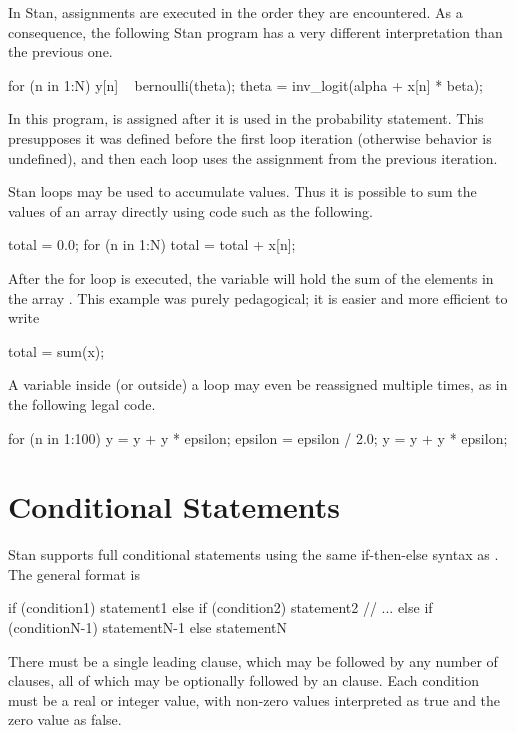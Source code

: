 In Stan, assignments are executed in the order they are encountered.
As a consequence, the following Stan program has a very different
interpretation than the previous one.
%
\begin{stancode}
for (n in 1:N) {
  y[n] ~ bernoulli(theta);
  theta = inv_logit(alpha + x[n] * beta);
}
\end{stancode}
%
In this program,  is assigned after it is used in the
probability statement.  This presupposes it was defined before the
first loop iteration (otherwise behavior is undefined), and then each
loop uses the assignment from the previous iteration.

Stan loops may be used to accumulate values.  Thus it is possible to
sum the values of an array directly using code such as the
following.
%
\begin{stancode}
total = 0.0;
for (n in 1:N)
  total = total + x[n];
\end{stancode}
%
After the for loop is executed, the variable  will hold
the sum of the elements in the array .  This example was
purely pedagogical; it is easier and more efficient to write
%
\begin{stancode}
total = sum(x);
\end{stancode}

A variable inside (or outside) a loop may even be reassigned multiple
times, as in the following legal code.
%
\begin{stancode}
for (n in 1:100) {
  y = y + y * epsilon;
  epsilon = epsilon / 2.0;
  y = y + y * epsilon;
}
\end{stancode}

\section{Conditional Statements}

Stan supports full conditional statements using
the same if-then-else syntax as \Cpp.  The general format is
%
\begin{stancode}
if (condition1)
  statement1
else if (condition2)
  statement2
// ...
else if (conditionN-1)
  statementN-1
else
  statementN
\end{stancode}
%
There must be a single leading  clause, which may be followed
by any number of  clauses, all of which may be
optionally followed by an  clause.  Each condition must be
a real or integer value, with non-zero values interpreted as true and
the zero value as false.

